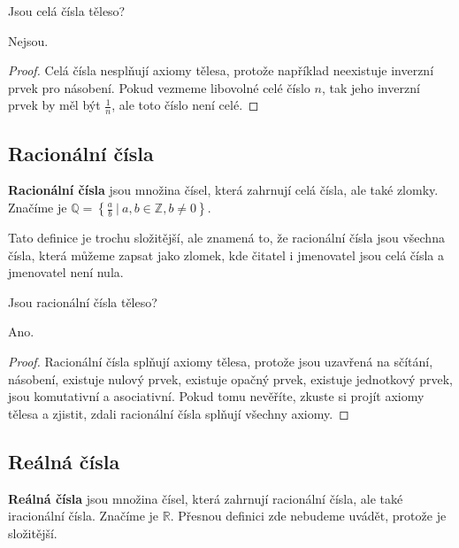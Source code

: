 \begin{problem}
  Jsou celá čísla těleso?
\end{problem}

\begin{solution}
  Nejsou.

  \begin{proof}
    Celá čísla nesplňují axiomy tělesa, protože například neexistuje inverzní prvek pro násobení. Pokud vezmeme libovolné celé číslo $n$, tak jeho inverzní prvek by měl být $\frac{1}{n}$, ale toto číslo není celé.
  \end{proof}
\end{solution}

\subsection{Racionální čísla}
\begin{definitionbox}
  \textbf{Racionální čísla} jsou množina čísel, která zahrnují celá čísla, ale také zlomky. Značíme je $\mathbb{Q} = \left\{\frac{a}{b}\ |\ a, b\in\mathbb{Z}, b\neq 0\right\}$.\ \vspace{2mm}

  Tato definice je trochu složitější, ale znamená to, že racionální čísla jsou všechna čísla, která můžeme zapsat jako zlomek, kde čitatel i jmenovatel jsou celá čísla a jmenovatel není nula. 
\end{definitionbox}

\begin{problem}
  Jsou racionální čísla těleso?
\end{problem}

\begin{solution}
  Ano.

  \begin{proof}
    Racionální čísla splňují axiomy tělesa, protože jsou uzavřená na sčítání, násobení, existuje nulový prvek, existuje opačný prvek, existuje jednotkový prvek, jsou komutativní a asociativní. Pokud tomu nevěříte, zkuste si projít axiomy tělesa a zjistit, zdali racionální čísla splňují všechny axiomy.
  \end{proof}
\end{solution}

\subsection{Reálná čísla}
\begin{definitionbox}
  \textbf{Reálná čísla} jsou množina čísel, která zahrnují racionální čísla, ale také iracionální čísla. Značíme je $\mathbb{R}$. Přesnou definici zde nebudeme uvádět, protože je složitější.
\end{definitionbox}

